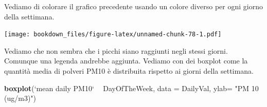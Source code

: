 \documentclass[]{book}
\newenvironment{Shaded}{\begin{snugshade}}{\end{snugshade}}
\newcommand{\CommentTok}[1]{\textcolor[rgb]{0.56,0.35,0.01}{\textit{#1}}}
\newcommand{\DataTypeTok}[1]{\textcolor[rgb]{0.13,0.29,0.53}{#1}}
\newcommand{\DecValTok}[1]{\textcolor[rgb]{0.00,0.00,0.81}{#1}}
\newcommand{\FloatTok}[1]{\textcolor[rgb]{0.00,0.00,0.81}{#1}}
\newcommand{\KeywordTok}[1]{\textcolor[rgb]{0.13,0.29,0.53}{\textbf{#1}}}
\newcommand{\NormalTok}[1]{#1}
\newcommand{\OperatorTok}[1]{\textcolor[rgb]{0.81,0.36,0.00}{\textbf{#1}}}
\newcommand{\StringTok}[1]{\textcolor[rgb]{0.31,0.60,0.02}{#1}}
\begin{document}
\begin{Shaded}
\end{Shaded}

Vediamo di colorare il grafico precedente usando un colore diverso per ogni giorno della settimana.

\begin{Shaded}
\end{Shaded}

\texttt{[image: bookdown\_files/figure-latex/unnamed-chunk-78-1.pdf]}

Vediamo che non sembra che i picchi siano raggiunti negli stessi giorni. Comunque una legenda andrebbe aggiunta. Vediamo con dei boxplot come la quantità media di polveri PM10 è distribuita rispetto ai giorni della settimana.

\begin{Shaded}
\begin{Highlighting}[]
\KeywordTok{boxplot}\NormalTok{(}\StringTok{`}\DataTypeTok{mean daily PM10}\StringTok{`} \OperatorTok{~}\StringTok{ }\NormalTok{DayOfTheWeek, }\DataTypeTok{data =}\NormalTok{ DailyVal, }\DataTypeTok{ylab=} \StringTok{"PM 10 (ug/m3)"}\NormalTok{)}
\end{Highlighting}
\end{Shaded}
\end{document}
